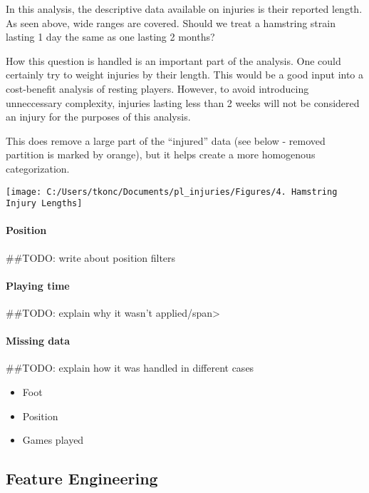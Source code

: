 \documentclass[]{article}
\providecommand{\tightlist}{%
  \setlength{\itemsep}{0pt}\setlength{\parskip}{0pt}}
\let\oldparagraph\paragraph
\renewcommand{\paragraph}[1]{\oldparagraph{#1}\mbox{}}
\begin{document}
In this analysis, the descriptive data available on injuries is their
reported length. As seen above, wide ranges are covered. Should we treat
a hamstring strain lasting 1 day the same as one lasting 2 months?

How this question is handled is an important part of the analysis. One
could certainly try to weight injuries by their length. This would be a
good input into a cost-benefit analysis of resting players. However, to
avoid introducing unneccessary complexity, injuries lasting less than 2
weeks will not be considered an injury for the purposes of this
analysis.

This does remove a large part of the ``injured'' data (see below -
removed partition is marked by orange), but it helps create a more
homogenous categorization.

\begin{center}\texttt{[image: C:/Users/tkonc/Documents/pl\_injuries/Figures/4. Hamstring Injury Lengths]} \end{center}

\paragraph{Position}\label{position}

{\#\#TODO: write about position filters}

\paragraph{Playing time}\label{playing-time}

\#\#TODO: explain why it wasn't applied/span\textgreater{}

\paragraph{Missing data}\label{missing-data}

{\#\#TODO: explain how it was handled in different cases}

\begin{itemize}
\tightlist
\item
  Foot
\item
  Position
\item
  Games played
\end{itemize}

\subsection{Feature Engineering}\label{feature-engineering}
\end{document}
